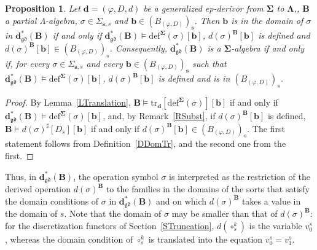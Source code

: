 \documentclass{amsart}
\theoremstyle{plain}
\newtheorem{proposition}[theorem]{Proposition}
\theoremstyle{definition}
\begin{document}
\begin{proposition}\label{PDomainDef}
Let $\mathbf{d}=(\varphi,D,d)$ be a generalized ep-derivor from $\mathbf{\Sigma}$ to $\mathbf{\Lambda}$,, $\mathbf{B}$ a partial $\Lambda$-algebra, $\sigma\in\Sigma_{\mathbf{s},s}$ and $\mathbf{b}\in(B_{(\varphi,D)})_{\mathbf{s}}$. Then $\mathbf{b}$ is in the domain of $\sigma$ in $\mathbf{d}^{\ast}_{\mathfrak{gd}}(\mathbf{B})$ if and only if $\mathbf{d}^{\ast}_{\mathfrak{gd}}(\mathbf{B})\models\mathrm{def}^{\mathbf{\Sigma}}(\sigma)[\mathbf{b}]$, $d(\sigma)^{\mathbf{B}}[\mathbf{b}]$ is defined and $d(\sigma)^{\mathbf{B}}[\mathbf{b}]\in(B_{(\varphi,D)})_{s}$. Consequently, $\mathbf{d}^{\ast}_{\mathfrak{gd}}(\mathbf{B})$ is a $\mathbf{\Sigma}$-algebra if and only if, for every $\sigma\in\Sigma_{\mathbf{s},s}$ and every $\mathbf{b}\in(B_{(\varphi,D)})_{\mathbf{s}}$ such that $\mathbf{d}^{\ast}_{\mathfrak{gd}}(\mathbf{B})\models\mathrm{def}^{\mathbf{\Sigma}}(\sigma)[\mathbf{b}]$, $d(\sigma)^{\mathbf{B}}[\mathbf{b}]$ is defined and is in $(B_{(\varphi,D)})_{s}$.
\end{proposition}
\begin{proof}
By Lemma~\ref{LTranslation}, $\mathbf{B}\models\mathrm{tr}_{\mathbf{d}}[\mathrm{def}^{\mathbf{\Sigma}}(\sigma)][\mathbf{b}]$ if and only if $\mathbf{d}^{\ast}_{\mathfrak{gd}}(\mathbf{B})\models\mathrm{def}^{\mathbf{\Sigma}}(\sigma)[\mathbf{b}]$, and, by Remark~\ref{RSubst}, if $d(\sigma)^{\mathbf{B}}[\mathbf{b}]$ is defined, $\mathbf{B}\models d(\sigma)^{\sharp}[D_{s}][\mathbf{b}]$ if and only if $d(\sigma)^{\mathbf{B}}[\mathbf{b}]\in(B_{(\varphi,D)})_{s}$. The first statement follows from Definition~\ref{DDomTr}, and the second one from the first.
\end{proof}

Thus, in $\mathbf{d}^{\ast}_{\mathfrak{gd}}(\mathbf{B})$, the operation symbol $\sigma$ is interpreted as the restriction of the derived operation $d(\sigma)^{\mathbf{B}}$ to the families in the domains of the sorts that satisfy the domain conditions of $\sigma$ in $\mathbf{d}^{\ast}_{\mathfrak{gd}}(\mathbf{B})$ and on which $d(\sigma)^{\mathbf{B}}$ takes a value in the domain of $s$. Note that the domain of $\sigma$ may be smaller than that of $d(\sigma)^{\mathbf{B}}$: for the discretization functors of Section~\ref{STruncation}, $d(\circ^{k}_{s})$ is the variable $v^{s}_{0}$, whereas the domain condition of $\circ^{k}_{s}$ is translated into the equation $v^{s}_{0}=v^{s}_{1}$.
\end{document}
